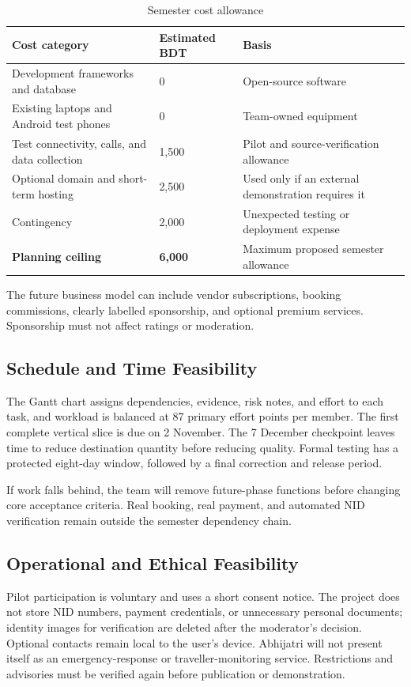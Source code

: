 \documentclass[11pt,a4paper]{article}
\newcommand{\hd}[1]{\textbf{#1}}
\begin{document}
\begin{table}[!htbp]
\centering
\caption{Semester cost allowance}\label{tab:budget}
{\small
\begin{tabularx}{\textwidth}{Y R{26mm} L{62mm}}
\toprule
\hd{Cost category} & \hd{Estimated BDT} & \hd{Basis} \\
\midrule
Development frameworks and database & 0 & Open-source software \\
Existing laptops and Android test phones & 0 & Team-owned equipment \\
Test connectivity, calls, and data collection & 1,500 & Pilot and source-verification allowance \\
Optional domain and short-term hosting & 2,500 & Used only if an external demonstration requires it \\
Contingency & 2,000 & Unexpected testing or deployment expense \\
\midrule
\textbf{Planning ceiling} & \textbf{6,000} & Maximum proposed semester allowance \\
\bottomrule
\end{tabularx}
}
\end{table}

The future business model can include vendor subscriptions, booking commissions, clearly labelled sponsorship, and optional premium services. Sponsorship must not affect ratings or moderation.

\subsection{Schedule and Time Feasibility}
The Gantt chart assigns dependencies, evidence, risk notes, and effort to each task, and workload is balanced at 87 primary effort points per member. The first complete vertical slice is due on 2 November. The 7 December checkpoint leaves time to reduce destination quantity before reducing quality. Formal testing has a protected eight-day window, followed by a final correction and release period.

If work falls behind, the team will remove future-phase functions before changing core acceptance criteria. Real booking, real payment, and automated NID verification remain outside the semester dependency chain.

\subsection{Operational and Ethical Feasibility}
Pilot participation is voluntary and uses a short consent notice. The project does not store NID numbers, payment credentials, or unnecessary personal documents; identity images for verification are deleted after the moderator's decision. Optional contacts remain local to the user's device. Abhijatri will not present itself as an emergency-response or traveller-monitoring service. Restrictions and advisories must be verified again before publication or demonstration.
\end{document}
